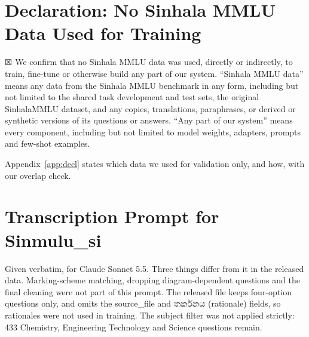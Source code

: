 \documentclass[11pt]{article}
\newcommand{\sinhalatext}[1]{{\sinhalafont #1}}
\newcommand{\ticked}{{\symbolfont ☒}}
\newcommand{\sinmulu}{Sinmulu\_si}
\begin{document}
\section{Declaration: No Sinhala MMLU Data Used for Training}\label{sec:declaration}
\ticked{} We confirm that no Sinhala MMLU data was used, directly or indirectly, to train, fine-tune or otherwise build any part of our system. ``Sinhala MMLU data'' means any data from the Sinhala MMLU benchmark in any form, including but not limited to the shared task development and test sets, the original SinhalaMMLU dataset, and any copies, translations, paraphrases, or derived or synthetic versions of its questions or answers. ``Any part of our system'' means every component, including but not limited to model weights, adapters, prompts and few-shot examples.

Appendix~\ref{app:decl} states which data we used for validation only, and how, with our overlap check.



\onecolumn
\appendix
\renewcommand{\thesection}{\Alph{section}}



\section{Transcription Prompt for \sinmulu{}}\label{app:prompt}
Given verbatim, for Claude Sonnet 5.5. Three things differ from it in the released data. Marking-scheme matching, dropping diagram-dependent questions and the final cleaning were not part of this prompt. The released file keeps four-option questions only, and omits the source\_file and \sinhalatext{තර්කනය} (rationale) fields, so rationales were not used in training. The subject filter was not applied strictly: 433 Chemistry, Engineering Technology and Science questions remain.

\medskip
{\footnotesize\ttfamily\raggedright\setlength{\parindent}{0pt}\setlength{\parskip}{1pt}

\par}
\end{document}
